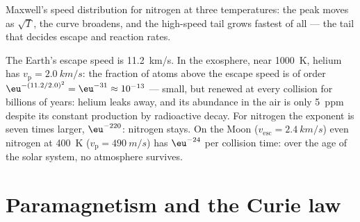 \begin{omfigure}

{\small Maxwell's speed distribution for nitrogen at three
temperatures: the peak moves as $\sqrt T$, the curve broadens, and the
high-speed tail grows fastest of all --- the tail that decides escape
and reaction rates.}
\end{omfigure}

\begin{example}\label{ex:b2:boltzmann-factor:escape}
The Earth's escape speed is \qty{11.2}{km/s}. In the exosphere, near
\qty{1000}{K}, helium has $v_{\text{p}} = \qty{2.0}{km/s}$: the fraction of
atoms above the escape speed is of order $\eu^{-(11.2/2.0)^2} = \eu^{-31}
\approx 10^{-13}$ --- small, but renewed at every collision for billions
of years: helium leaks away, and its abundance in the air is only
\qty{5}{ppm} despite its constant production by radioactive decay. For
nitrogen the exponent is seven times larger, $\eu^{-220}$: nitrogen stays.
On the Moon ($v_{\text{esc}} = \qty{2.4}{km/s}$) even nitrogen at
\qty{400}{K} ($v_{\text{p}} = \qty{490}{m/s}$) has $\eu^{-24}$ per collision time:
over the age of the solar system, no atmosphere survives.
\end{example}

\section{Paramagnetism and the Curie law}

